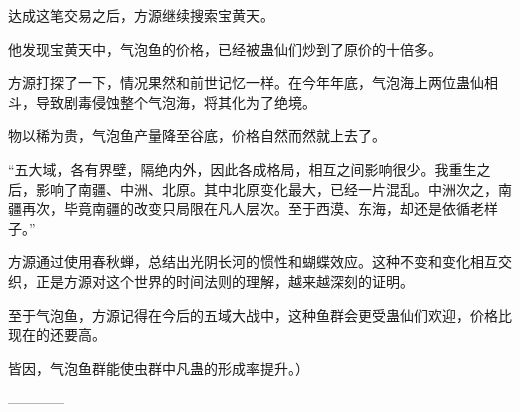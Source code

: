 \begin{this_body}
达成这笔交易之后，方源继续搜索宝黄天。

他发现宝黄天中，气泡鱼的价格，已经被蛊仙们炒到了原价的十倍多。

方源打探了一下，情况果然和前世记忆一样。在今年年底，气泡海上两位蛊仙相斗，导致剧毒侵蚀整个气泡海，将其化为了绝境。

物以稀为贵，气泡鱼产量降至谷底，价格自然而然就上去了。

“五大域，各有界壁，隔绝内外，因此各成格局，相互之间影响很少。我重生之后，影响了南疆、中洲、北原。其中北原变化最大，已经一片混乱。中洲次之，南疆再次，毕竟南疆的改变只局限在凡人层次。至于西漠、东海，却还是依循老样子。”

方源通过使用春秋蝉，总结出光阴长河的惯性和蝴蝶效应。这种不变和变化相互交织，正是方源对这个世界的时间法则的理解，越来越深刻的证明。

至于气泡鱼，方源记得在今后的五域大战中，这种鱼群会更受蛊仙们欢迎，价格比现在的还要高。

皆因，气泡鱼群能使虫群中凡蛊的形成率提升。）

------------

\end{this_body}

